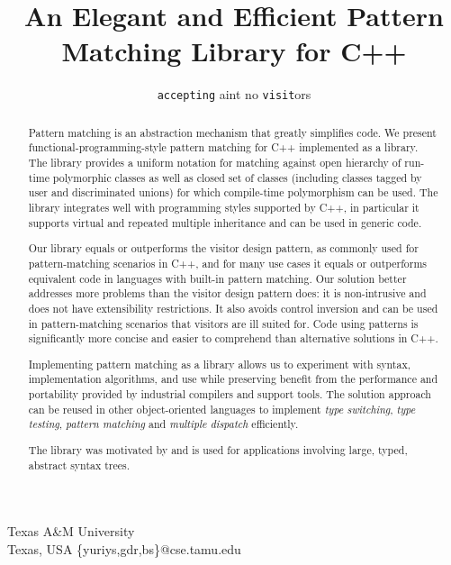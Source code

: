 \documentclass[preprint]{sigplanconf}
\makeatletter
\DeclareRobustCommand{\code}[1]{{\lstinline[breaklines=false,escapechar=@]{#1}}}
\makeatother
\begin{document}


\title{An Elegant and Efficient Pattern Matching Library for C++}
\subtitle{\code{accepting} aint no \code{visit}ors}

           {Texas A\&M University\\ Texas, USA}
           {\{yuriys,gdr,bs\}@cse.tamu.edu}

\maketitle

\begin{abstract}
Pattern matching is an abstraction mechanism that greatly simplifies code. We 
present functional-programming-style pattern matching for C++ 
implemented as a library. The library provides a uniform notation for 
matching against open hierarchy of run-time polymorphic classes as well as closed 
set of classes (including classes tagged by user and discriminated unions)
for which compile-time polymorphism can be used. The
 library integrates well with programming styles supported by C++, in 
particular it supports virtual and repeated multiple inheritance and can
 be used in generic code.

Our library equals or outperforms the visitor design pattern, as commonly 
used for pattern-matching scenarios in C++, and for many use cases it 
equals or outperforms equivalent code in languages with built-in pattern
 matching. Our solution better addresses more problems than the visitor
 design pattern does: it is non-intrusive and does not have 
extensibility restrictions. It also avoids control 
inversion and can be used in pattern-matching scenarios that visitors are ill suited for.
Code using patterns is significantly more concise and easier to comprehend than alternative solutions in C++.

Implementing pattern matching as a library allows us to experiment with syntax, 
implementation algorithms, and use while preserving benefit from the 
performance and portability provided by industrial compilers and support
 tools. The solution approach can be reused in other object-oriented 
languages to implement \emph{type switching}, \emph{type testing}, 
\emph{pattern matching} and \emph{multiple dispatch} efficiently.

The library was motivated by and is used for applications involving large, typed, abstract syntax trees.
\end{abstract}
\end{document}

